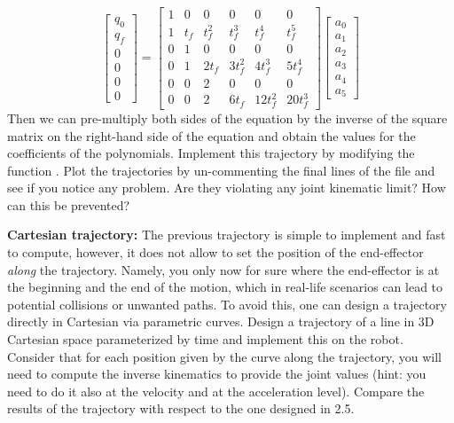 \documentclass[11pt]{article}
\begin{document}
\begin{equation*}
	\begin{bmatrix}
		q_0 \\
		q_f \\
		0 \\
		0 \\
		0 \\
		0
	\end{bmatrix} =
	\begin{bmatrix}
		1 & 0   & 0     &       0 &        0 &     0 \\
		1 & t_f & t_f^2 &   t_f^3 &    t_f^4 & t_f^5 \\
		0 &   1 &     0 &       0 &        0 &     0 \\
		0 &   1 & 2 t_f & 3 t_f^2 &  4 t_f^3 & 5 t_f^4 \\
		0 &   0 &     2 &       0 &        0 &     0 \\
		0 &   0 &     2 &   6 t_f & 12 t_f^2 & 20 t_f^3
	\end{bmatrix}
	\begin{bmatrix}
		a_0 \\
		a_1 \\ 
		a_2 \\
		a_3 \\
		a_4 \\
		a_5
	\end{bmatrix}
\end{equation*}
Then we can pre-multiply both sides of the equation by the inverse of the square matrix on the right-hand side of the equation and obtain the values for the coefficients of the polynomials.
Implement this trajectory by modifying the function . Plot the trajectories by un-commenting the final lines of the file  and see if you notice any problem. Are they violating any joint kinematic limit? How can this be prevented? 

\textbf{Cartesian trajectory:} The previous trajectory is simple to implement and fast to compute, however, it does not allow to set the position of the end-effector \textit{along} the trajectory. Namely, you only now for sure where the end-effector is at the beginning and the end of the motion, which in real-life scenarios can lead to potential collisions or unwanted paths. To avoid this, one can design a trajectory directly in Cartesian via parametric curves. Design a trajectory of a line in 3D Cartesian space parameterized by time and implement this on the robot. Consider that for each position given by the curve along the trajectory, you will need to compute the inverse kinematics to provide the joint values (hint: you need to do it also at the velocity and at the acceleration level). Compare the results of the trajectory with respect to the one designed in 2.5.\\
\end{document}
